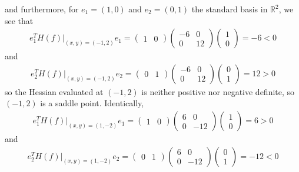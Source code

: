 \documentclass[11pt, letterpaper]{article}
\newcommand{\mbb}[1]{\mathbb{#1}}
\begin{document}
    and furthermore, for $e_1=(1,0)$ and $e_2=(0,1)$ the standard basis in $\mbb{R}^2$, we see that
    \begin{align*}
        e_1^TH(f)\big|_{(x,y)=(-1,2)}e_1=\begin{pmatrix}
            1 & 0
        \end{pmatrix}\begin{pmatrix}
            -6 & 0\\
            0 & 12
        \end{pmatrix}\begin{pmatrix}
            1\\
            0
        \end{pmatrix}=-6<0
    \end{align*}
    and
    \begin{align*}
        e_2^TH(f)\big|_{(x,y)=(-1,2)}e_2=\begin{pmatrix}
            0 & 1
        \end{pmatrix}\begin{pmatrix}
            -6 & 0\\
            0 & 12
        \end{pmatrix}\begin{pmatrix}
            0\\
            1
        \end{pmatrix}=12>0
    \end{align*}
    so the Hessian evaluated at $(-1, 2)$ is neither positive nor negative definite, so $(-1, 2)$ is a saddle point. Identically,
    \begin{align*}
        e_1^TH(f)\big|_{(x,y)=(1,-2)}e_1=\begin{pmatrix}
            1 & 0
        \end{pmatrix}\begin{pmatrix}
            6 & 0\\
            0 & -12
        \end{pmatrix}\begin{pmatrix}
            1\\
            0
        \end{pmatrix}=6>0
    \end{align*}
    and
    \begin{align*}
        e_2^TH(f)\big|_{(x,y)=(1,-2)}e_2=\begin{pmatrix}
            0 & 1
        \end{pmatrix}\begin{pmatrix}
            6 & 0\\
            0 & -12
        \end{pmatrix}\begin{pmatrix}
            0\\
            1
        \end{pmatrix}=-12<0
    \end{align*}
\end{document}
